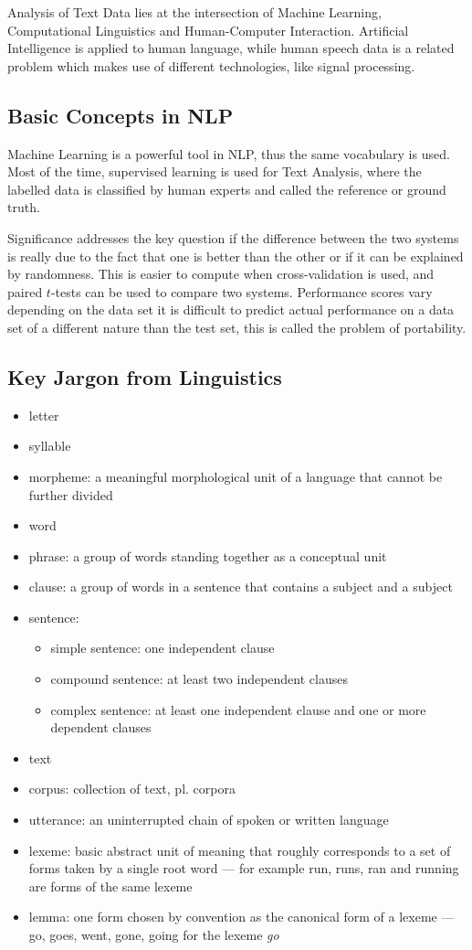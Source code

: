 \documentclass[11pt]{article}
\begin{document}
Analysis of Text Data lies at the intersection of Machine Learning, Computational Linguistics and Human-Computer Interaction. Artificial Intelligence is applied to human language, while human speech data is a related problem which makes use of different technologies, like signal processing.

\subsection{Basic Concepts in NLP}
Machine Learning is a powerful tool in NLP, thus the same vocabulary is used. Most of the time, supervised learning is used for Text Analysis, where the labelled data is classified by human experts and called the reference or ground truth.

Significance addresses the key question if the difference between the two systems is really due to the fact that one is better than the other or if it can be explained by randomness. This is easier to compute when cross-validation is used, and paired $t$-tests can be used to compare two systems. Performance scores vary depending on the data set it is difficult to predict actual performance on a data set of a different
nature than the test set, this is called the problem of portability.

\subsection{Key Jargon from Linguistics}
\begin{itemize}
	\item letter
	\item syllable
	\item morpheme: a meaningful morphological unit of a language that cannot be further divided
	\item word
	\item phrase: a group of words standing together as a conceptual unit
	\item clause: a group of words in a sentence that contains a subject and a subject
	\item sentence:
	\begin{itemize}
		\item simple sentence: one independent clause
		\item compound sentence: at least two independent clauses
		\item complex sentence: at least one independent clause and one or more dependent clauses
	\end{itemize}
	\item text
	\item corpus: collection of text, pl. corpora
	\item utterance: an uninterrupted chain of spoken or written language
	\item lexeme: basic abstract unit of meaning that roughly corresponds to a set of forms taken by a single root word — for example run, runs, ran and running are forms of the same lexeme
	\item lemma: one form chosen by convention as the canonical form of a lexeme — go, goes, went, gone, going for the lexeme \emph{go}
\end{itemize}
\end{document}
